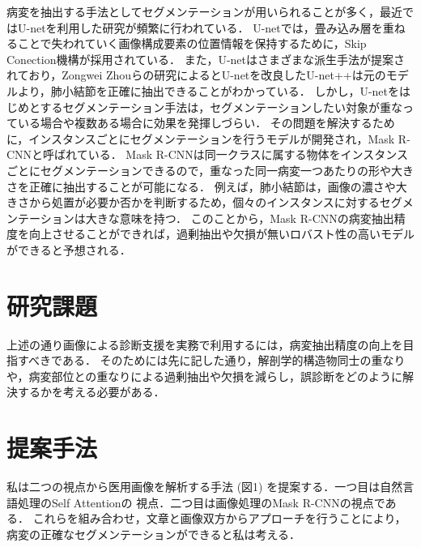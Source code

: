 \documentclass[a4j,10pt,twocolumn]{jarticle}
\begin{document}
病変を抽出する手法としてセグメンテーションが用いられることが多く，最近ではU-netを利用した研究が頻繁に行われている\cite{近藤堅司2018u}．
U-netでは，畳み込み層を重ねることで失われていく画像構成要素の位置情報を保持するために，Skip Conection機構が採用されている．
また，U-netはさまざまな派生手法が提案されており，Zongwei Zhouらの研究によるとU-netを改良したU-net++\cite{zhou2018unet++}は元のモデルより，肺小結節を正確に抽出できることがわかっている．
しかし，U-netをはじめとするセグメンテーション手法は，セグメンテーションしたい対象が重なっている場合や複数ある場合に効果を発揮しづらい．
その問題を解決するために，インスタンスごとにセグメンテーションを行うモデルが開発され，Mask R-CNNと呼ばれている\cite{he2017mask}．
Mask R-CNNは同一クラスに属する物体をインスタンスごとにセグメンテーションできるので，重なった同一病変一つあたりの形や大きさを正確に抽出することが可能になる．
例えば，肺小結節は，画像の濃さや大きさから処置が必要か否かを判断するため，個々のインスタンスに対するセグメンテーションは大きな意味を持つ．
このことから，Mask R-CNNの病変抽出精度を向上させることができれば，過剰抽出や欠損が無いロバスト性の高いモデルができると予想される．

\section{研究課題}
上述の通り画像による診断支援を実務で利用するには，病変抽出精度の向上を目指すべきである．
そのためには先に記した通り，解剖学的構造物同士の重なりや，病変部位との重なりによる過剰抽出や欠損を減らし，誤診断をどのように解決するかを考える必要がある．


\section{提案手法}
私は二つの視点から医用画像を解析する手法 (図1) を提案する．一つ目は自然言語処理のSelf Attention\cite{vaswani2017attention}の
視点．二つ目は画像処理のMask R-CNNの視点である．
これらを組み合わせ，文章と画像双方からアプローチを行うことにより，病変の正確なセグメンテーションができると私は考える．
\end{document}
